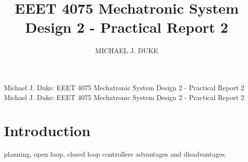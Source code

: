 \documentclass{ieeeaccess}
\begin{document}

\title{EEET 4075 Mechatronic System Design 2 - Practical Report 2}
\author{\uppercase{Michael J. Duke}}
\address[1]{University of South Australia, Mawson Lakes, SA 5095 Australia (e-mail: dukmj002@mymail.unisa.edu.au)}

\markboth
{Michael J. Duke: EEET 4075 Mechatronic System Design 2 - Practical Report 2}
{Michael J. Duke: EEET 4075 Mechatronic System Design 2 - Practical Report 2}

\titlepgskip=-15pt

\maketitle




\section{Introduction}
\label{sec:introduction}
 planning, open loop, closed loop controllers advantages and disadvantages.\par
\end{document}
